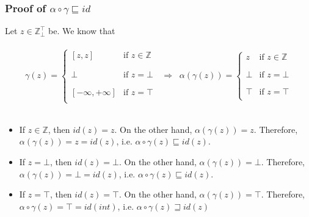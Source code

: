 \documentclass{article}
\newcommand{\ztop}{\mathbb{Z}_{\bot}^{\top}}
\newcommand{\zta}{\mathbb{Z}}
\begin{document}
\subsubsection*{Proof of $\alpha \circ \gamma \sqsubseteq id$}

Let $z \in \ztop$ be. We know that\\\\
\begin{equation*}
    \gamma(z) = \left\{
\begin{array}{ll}
      [ z, z]   & \text{if $z \in \mathbb{Z}$}\\
      \\ \\
        \bot   & \text{if $z = \bot$}\\
\\ \\
       \left[- \infty , + \infty \right]  & \text{if $z = \top $}\\
        
\end{array} 
\right.
\;\; \Rightarrow \;\;
\alpha(\gamma(z)) = \left\{
\begin{array}{ll}
      z   & \text{if $z \in \mathbb{Z}$}\\
      \\ \\
        \bot   & \text{if $z = \bot$}\\
\\ \\
       \top & \text{if $z = \top $}\\
        
\end{array} 
\right.
\end{equation*}\\
\begin{itemize}
    \item If $z \in \zta$, then $id(z) = z$. On the other hand, $\alpha(\gamma(z)) = z$. Therefore, $\alpha(\gamma(z)) = z = id(z)$, i.e. $\alpha \circ \gamma(z) \sqsubseteq id(z)$.
    \item If $z = \bot$, then $id(z) = \bot$. On the other hand, $\alpha(\gamma(z)) = \bot$. Therefore, $\alpha(\gamma(z)) = \bot = id(z)$, i.e. $\alpha \circ \gamma(z) \sqsubseteq id(z)$.
    \item If $z = \top$, then $id(z) = \top$. On the other hand, $\alpha(\gamma(z)) = \top$. Therefore, $\alpha \circ \gamma(z) = \top  = id(int)$, i.e. $\alpha \circ \gamma(z) \sqsupseteq id(z)$
\end{itemize}\\\\
\end{document}
